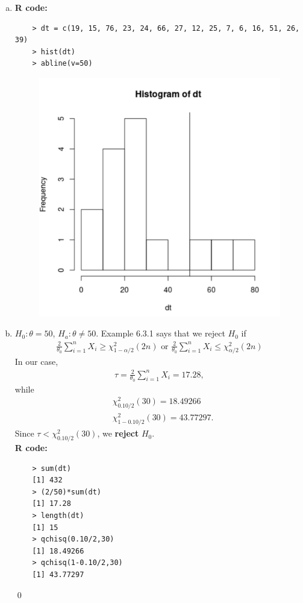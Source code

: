 \documentclass{book}
\theoremstyle{definition}
\newcommand{\nn}{\nonumber}
\newcommand{\al}{\alpha}
\newcommand{\f}[2]{\frac{#1}{#2}}
\begin{document}
\begin{enumerate}[(a)]
	\item 
	\textbf{R code:}
	\begin{lstlisting}
	> dt = c(19, 15, 76, 23, 24, 66, 27, 12, 25, 7, 6, 16, 51, 26, 39)
	> hist(dt)
	> abline(v=50)
	\end{lstlisting}
	\begin{figure}[!htb]
		\centering
		\includegraphics[scale=0.5]{631-hist}
	\end{figure}




	\item $H_0: \theta = 50$, $H_a : \theta \neq 50$. Example 6.3.1 says that we reject $H_0$ if
	\begin{align}
	\f{2}{\theta_0} \sum^n_{i=1}X_i \geq \chi^2_{1-\al/2}(2n)\mbox{ or } \f{2}{\theta_0} \sum^n_{i=1}X_i \leq \chi^2_{\al/2}(2n)
	\end{align}
	In our case, 
	\begin{align}
	\tau = \f{2}{\theta_0} \sum^n_{i=1}X_i  = 17.28,
	\end{align}
	while 
	\begin{align}
	&\chi^2_{0.10/2}(30) = 18.49266\nn\\
	&\chi^2_{1-0.10/2}(30) = 43.77297.
	\end{align}
	Since $\tau < \chi^2_{0.10/2}(30)$, we \textbf{reject} $H_0$.\\
	
	\textbf{R code:}
	\begin{lstlisting}
	> sum(dt)
	[1] 432
	> (2/50)*sum(dt)
	[1] 17.28
	> length(dt)
	[1] 15
	> qchisq(0.10/2,30)
	[1] 18.49266
	> qchisq(1-0.10/2,30)
	[1] 43.77297
	\end{lstlisting}
	\qed
	
	
	
	
	
	
\end{enumerate}
\end{document}
